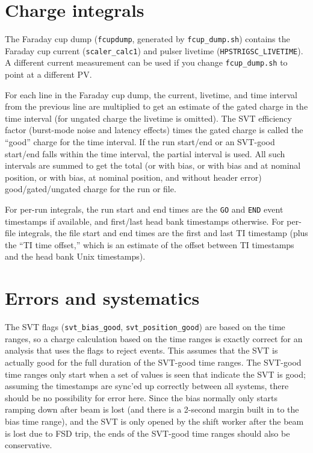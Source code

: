 \documentclass[aps,amsmath,amssymb,notitlepage,10pt,onecolumn]{revtex4-1}
\begin{document}
\section{Charge integrals}
The Faraday cup dump (\texttt{fcupdump}, generated by \texttt{fcup\_dump.sh}) contains the Faraday cup current (\texttt{scaler\_calc1}) and pulser livetime (\texttt{HPSTRIGSC\_LIVETIME}). 
A different current measurement can be used if you change \texttt{fcup\_dump.sh} to point at a different PV.

For each line in the Faraday cup dump, the current, livetime, and time interval from the previous line are multiplied to get an estimate of the gated charge in the time interval (for ungated charge the livetime is omitted).
The SVT efficiency factor (burst-mode noise and latency effects) times the gated charge is called the ``good'' charge for the time interval.
If the run start/end or an SVT-good start/end falls within the time interval, the partial interval is used.
All such intervals are summed to get the total (or with bias, or with bias and at nominal position, or with bias, at nominal position, and without header error) good/gated/ungated charge for the run or file.

For per-run integrals, the run start and end times are the \texttt{GO} and \texttt{END} event timestamps if available, and first/last head bank timestamps otherwise.
For per-file integrals, the file start and end times are the first and last TI timestamp (plus the ``TI time offset,'' which is an estimate of the offset between TI timestamps and the head bank Unix timestamps).

\section{Errors and systematics}
The SVT flags (\texttt{svt\_bias\_good}, \texttt{svt\_position\_good}) are based on the time ranges, so a charge calculation based on the time ranges is exactly correct for an analysis that uses the flags to reject events.
This assumes that the SVT is actually good for the full duration of the SVT-good time ranges.
The SVT-good time ranges only start when a set of values is seen that indicate the SVT is good; assuming the timestamps are sync'ed up correctly between all systems, there should be no possibility for error here.
Since the bias normally only starts ramping down after beam is lost (and there is a 2-second margin built in to the bias time range), and the SVT is only opened by the shift worker after the beam is lost due to FSD trip, the ends of the SVT-good time ranges should also be conservative.
\end{document}
